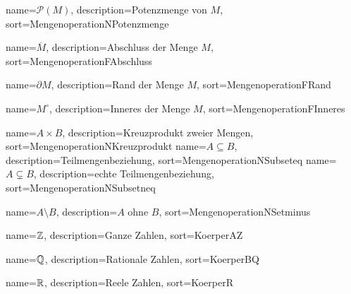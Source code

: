 
{
  name={\ensuremath{\mathcal{P}(M)}},
  description={Potenzmenge von $M$},
  sort=MengenoperationNPotenzmenge
}

{
  name={\ensuremath{\overline{M}}},
  description={Abschluss der Menge $M$},
  sort=MengenoperationFAbschluss
}

{
  name={\ensuremath{\partial M}},
  description={Rand der Menge $M$},
  sort=MengenoperationFRand
}

{
  name={\ensuremath{M^\circ}},
  description={Inneres der Menge $M$},
  sort=MengenoperationFInneres
}

{
  name={\ensuremath{A \times B}},
  description={Kreuzprodukt zweier Mengen},
  sort=MengenoperationNKreuzprodukt
}
{
  name={\ensuremath{A \subseteq B}},
  description={Teilmengenbeziehung},
  sort=MengenoperationNSubseteq
}
{
  name={\ensuremath{A \subsetneq B}},
  description={echte Teilmengenbeziehung},
  sort=MengenoperationNSubsetneq
}

{
  name={\ensuremath{A \setminus B}},
  description={$A$ ohne $B$},
  sort=MengenoperationNSetminus
}


{
  name={\ensuremath{\mdz}},
  description={Ganze Zahlen},
  sort=KoerperAZ
}

{
  name={\ensuremath{\mdq}},
  description={Rationale Zahlen},
  sort=KoerperBQ
}

{
  name={\ensuremath{\mdr}},
  description={Reele Zahlen},
  sort=KoerperR
}


